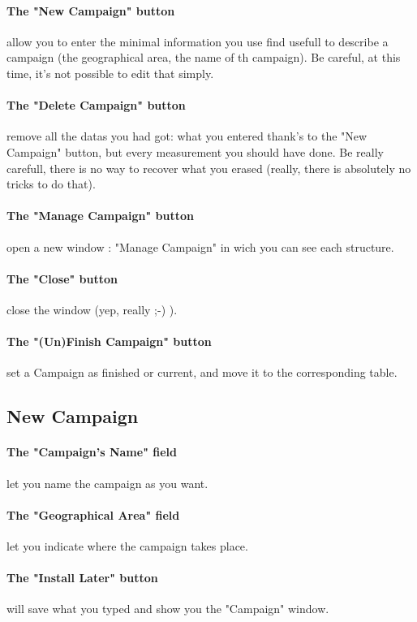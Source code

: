 \documentclass[11pt]{report}
\begin{document}
		    \paragraph{The "New Campaign" button} allow you to enter the minimal information you use find usefull to describe
		    a campaign (the geographical area, the name of th campaign). Be careful, at this time, it's not possible 
		    to edit that simply.
		    \paragraph{The "Delete Campaign" button} remove all the datas you had got: what you entered thank's to the "New 
		    Campaign" button, but every measurement you should have done. Be really carefull, there is no way to 
		    recover what you erased (really, there is absolutely no tricks to do that).
		    \paragraph{The "Manage Campaign" button} open a new window : "Manage Campaign" in wich you can see each structure.
		    \paragraph{The "Close" button} close the window (yep, really ;-) ).
		    \paragraph{The "(Un)Finish Campaign" button} set a Campaign as finished or current, and move it to the corresponding table.

		\subsection{New Campaign}
		    \paragraph{The "Campaign's Name" field} let you name the campaign as you want.
		    \paragraph{The "Geographical Area" field} let you indicate where the campaign takes place.
		    \paragraph{The "Install Later" button} will save what you typed and show you the "Campaign" window.
\end{document}
